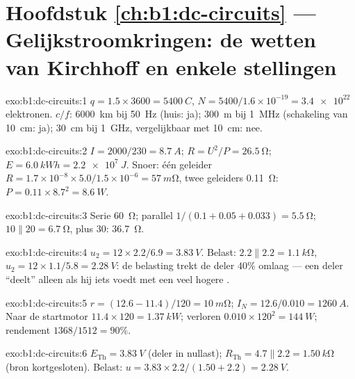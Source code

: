 \section*{Hoofdstuk \ref{ch:b1:dc-circuits} --- Gelijkstroomkringen: de wetten van Kirchhoff en enkele stellingen}

\begin{solution}{exo:b1:dc-circuits:1}
$q = 1.5 \times 3600 = \qty{5400}{C}$, $N = 5400/1.6\times10^{-19} =
\num{3.4e22}$ elektronen. $c/f$: \qty{6000}{km} bij \qty{50}{Hz} (huis:
ja); \qty{300}{m} bij \qty{1}{MHz} (schakeling van \qty{10}{cm}: ja);
\qty{30}{cm} bij \qty{1}{GHz}, vergelijkbaar met \qty{10}{cm}: nee.
\end{solution}

\begin{solution}{exo:b1:dc-circuits:2}
$I = 2000/230 = \qty{8.7}{A}$; $R = U^2/P = \qty{26.5}{\ohm}$; $E =
\qty{6.0}{kWh} = \qty{2.2e7}{J}$. Snoer: één geleider $R = 1.7\times10^{-8}
\times 5.0/1.5\times10^{-6} = \qty{57}{m\ohm}$, twee geleiders
\qty{0.11}{\ohm}: $P = 0.11 \times 8.7^2 = \qty{8.6}{W}$.
\end{solution}

\begin{solution}{exo:b1:dc-circuits:3}
Serie \qty{60}{\ohm}; parallel $1/(0.1 + 0.05 + 0.033) = \qty{5.5}{\ohm}$;
$10 \parallel 20 = \qty{6.7}{\ohm}$, plus $30$: \qty{36.7}{\ohm}.
\end{solution}

\begin{solution}{exo:b1:dc-circuits:4}
$u_2 = 12 \times 2.2/6.9 = \qty{3.83}{V}$. Belast: $2.2 \parallel 2.2 =
\qty{1.1}{k\ohm}$, $u_2 = 12 \times 1.1/5.8 = \qty{2.28}{V}$: de belasting
trekt de deler $40\%$ omlaag --- een deler ``deelt'' alleen als hij
iets voedt met een veel hogere .
\end{solution}

\begin{solution}{exo:b1:dc-circuits:5}
$r = (12.6 - 11.4)/120 = \qty{10}{m\ohm}$; $I_N = 12.6/0.010 =
\qty{1260}{A}$. Naar de startmotor $11.4 \times 120 = \qty{1.37}{kW}$; verloren
$0.010 \times 120^2 = \qty{144}{W}$; rendement $1368/1512 = 90\%$.
\end{solution}

\begin{solution}{exo:b1:dc-circuits:6}
$E_{\mathrm{Th}} = \qty{3.83}{V}$ (deler in nullast); $R_{\mathrm{Th}}
= 4.7 \parallel 2.2 = \qty{1.50}{k\ohm}$ (bron kortgesloten). Belast:
$u = 3.83 \times 2.2/(1.50 + 2.2) = \qty{2.28}{V}$.
\end{solution}

